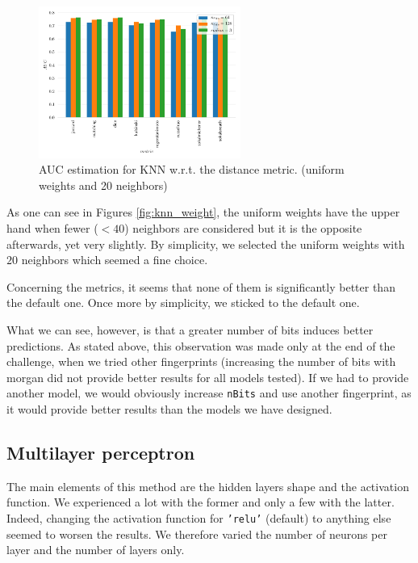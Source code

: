\begin{figure}[h]
    \centering
    \includegraphics[width=0.59\textwidth]{resources/pdf/knn-metrics.pdf}
    \caption{AUC estimation for KNN w.r.t. the distance metric. (uniform weights and 20 neighbors)}
    \label{fig:knn_metrics}
\end{figure}

As one can see in Figures \ref{fig:knn_weight}, the uniform weights have the upper hand when fewer ($< 40$) neighbors are considered but it is the opposite afterwards, yet very slightly. By simplicity, we selected the uniform weights with $20$ neighbors which seemed a fine choice.

Concerning the metrics, it seems that none of them is significantly better than the default one. Once more by simplicity, we sticked to the default one.

What we can see, however, is that a greater number of bits induces better predictions. As stated above, this observation was made only at the end of the challenge, when we tried other fingerprints (increasing the number of bits with morgan did not provide better results for all models tested). If we had to provide another model, we would obviously increase \texttt{nBits} and use another fingerprint, as it would provide better results than the models we have designed.

\subsection{Multilayer perceptron}

The main elements of this method are the hidden layers shape and the activation function. We experienced a lot with the former and only a few with the latter. Indeed, changing the activation function for \texttt{'relu'} (default) to anything else seemed to worsen the results. We therefore varied the number of neurons per layer and the number of layers only.

